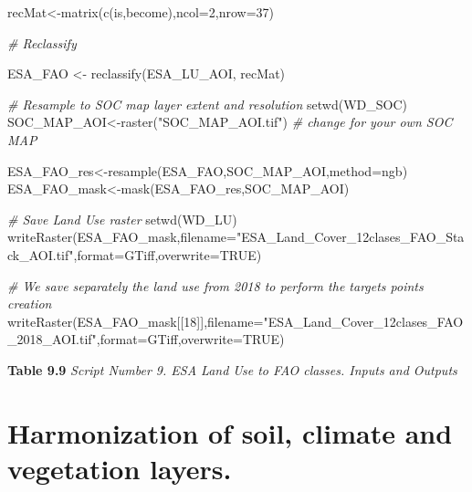 \documentclass[
  10pt,
  b5paper,
]{book}
\newenvironment{Shaded}{\begin{snugshade}}{\end{snugshade}}
\newcommand{\AttributeTok}[1]{\textcolor[rgb]{0.77,0.63,0.00}{#1}}
\newcommand{\CommentTok}[1]{\textcolor[rgb]{0.56,0.35,0.01}{\textit{#1}}}
\newcommand{\ConstantTok}[1]{\textcolor[rgb]{0.00,0.00,0.00}{#1}}
\newcommand{\DecValTok}[1]{\textcolor[rgb]{0.00,0.00,0.81}{#1}}
\newcommand{\FunctionTok}[1]{\textcolor[rgb]{0.00,0.00,0.00}{#1}}
\newcommand{\NormalTok}[1]{#1}
\newcommand{\OtherTok}[1]{\textcolor[rgb]{0.56,0.35,0.01}{#1}}
\newcommand{\StringTok}[1]{\textcolor[rgb]{0.31,0.60,0.02}{#1}}
\begin{document}
\begin{Shaded}
\begin{Highlighting}[]
\NormalTok{recMat}\OtherTok{\textless{}{-}}\FunctionTok{matrix}\NormalTok{(}\FunctionTok{c}\NormalTok{(is,become),}\AttributeTok{ncol=}\DecValTok{2}\NormalTok{,}\AttributeTok{nrow=}\DecValTok{37}\NormalTok{)}

\CommentTok{\# Reclassify}

\NormalTok{ESA\_FAO }\OtherTok{\textless{}{-}} \FunctionTok{reclassify}\NormalTok{(ESA\_LU\_AOI, recMat)}

\CommentTok{\# Resample to SOC map layer extent and resolution}
\FunctionTok{setwd}\NormalTok{(WD\_SOC)}
\NormalTok{SOC\_MAP\_AOI}\OtherTok{\textless{}{-}}\FunctionTok{raster}\NormalTok{(}\StringTok{"SOC\_MAP\_AOI.tif"}\NormalTok{) }\CommentTok{\# change for your own SOC MAP}

\NormalTok{ESA\_FAO\_res}\OtherTok{\textless{}{-}}\FunctionTok{resample}\NormalTok{(ESA\_FAO,SOC\_MAP\_AOI,}\AttributeTok{method=}\StringTok{\textquotesingle{}ngb\textquotesingle{}}\NormalTok{) }
\NormalTok{ESA\_FAO\_mask}\OtherTok{\textless{}{-}}\FunctionTok{mask}\NormalTok{(ESA\_FAO\_res,SOC\_MAP\_AOI) }

\CommentTok{\# Save Land Use raster}
\FunctionTok{setwd}\NormalTok{(WD\_LU)}
\FunctionTok{writeRaster}\NormalTok{(ESA\_FAO\_mask,}\AttributeTok{filename=}\StringTok{"ESA\_Land\_Cover\_12clases\_FAO\_Stack\_AOI.tif"}\NormalTok{,}\AttributeTok{format=}\StringTok{\textquotesingle{}GTiff\textquotesingle{}}\NormalTok{,}\AttributeTok{overwrite=}\ConstantTok{TRUE}\NormalTok{)}

\CommentTok{\# We save separately the land use from 2018 to perform the target\textquotesingle{}s points creation}
\FunctionTok{writeRaster}\NormalTok{(ESA\_FAO\_mask[[}\DecValTok{18}\NormalTok{]],}\AttributeTok{filename=}\StringTok{"ESA\_Land\_Cover\_12clases\_FAO\_2018\_AOI.tif"}\NormalTok{,}\AttributeTok{format=}\StringTok{\textquotesingle{}GTiff\textquotesingle{}}\NormalTok{,}\AttributeTok{overwrite=}\ConstantTok{TRUE}\NormalTok{)}
\end{Highlighting}
\end{Shaded}

\textbf{Table 9.9} \emph{Script Number 9. ESA Land Use to FAO classes. Inputs and Outputs}

\hypertarget{harmonization-of-soil-climate-and-vegetation-layers.}{%
\section{Harmonization of soil, climate and vegetation layers.}\label{harmonization-of-soil-climate-and-vegetation-layers.}}
\end{document}
